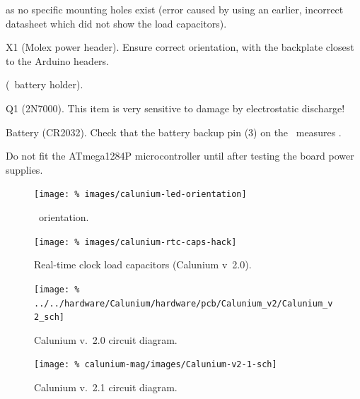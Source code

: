 \begin{buildorder}
  as no specific mounting holes exist (error caused by using an
  earlier, incorrect datasheet which did not show the load
  capacitors).
\item X1 (Molex power header). Ensure correct orientation, with the
  backplate closest to the Arduino headers.
\item {} (\rtc\ battery holder).
\item Q1 (2N7000). This item is very sensitive to damage by
  electrostatic discharge!
\item Battery (CR2032). Check that the battery backup pin (3) on the
  \rtc\ measures .
\item {}
\end{buildorder}
Do not fit the ATmega1284P microcontroller until after testing the
board power supplies.

\begin{figure}
  \centering
  \texttt{[image: \%
    images/calunium-led-orientation]}
  \caption[LED orientation]{\led\ orientation. }
  \label{fig:calunium-led-orientation}
\end{figure}
\begin{figure}
  \centering
  \texttt{[image: \%
    images/calunium-rtc-caps-hack]}
  \caption[Real-time clock load capacitors (Calunium v~2.0)]{%
    Real-time clock load capacitors (Calunium v~2.0). }
  \label{fig:calunium-rtc-caps-hack}
\end{figure}


\begin{landscape}
  \begin{figure}[p]
    \centering
    \texttt{[image: \%
      ../../hardware/Calunium/hardware/pcb/Calunium\_v2/Calunium\_v2\_sch]}  
    \caption{Calunium v.~2.0 circuit diagram.}
    \label{fig:calunium-v2.0-cct-diag}
  \end{figure}
  \begin{figure}[p]
    \centering
    \texttt{[image: \%
      calunium-mag/images/Calunium-v2-1-sch]}
    \caption{Calunium v.~2.1 circuit diagram.}
    \label{fig:calunium-v2.1-cct-diag}
  \end{figure}
\end{landscape}

